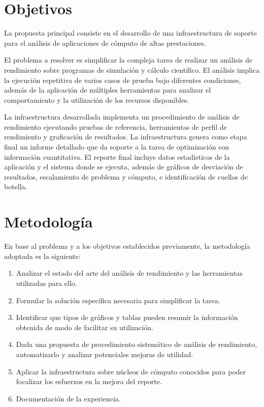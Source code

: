 \documentclass[a4paper]{report}
\begin{document}
\section{Objetivos}

La propuesta principal consiste en el desarrollo de una infraestructura de soporte para el análisis de aplicaciones de cómputo de altas prestaciones.

\bigskip

El problema a resolver es simplificar la compleja tarea de realizar un análisis de rendimiento sobre programas de simulación y cálculo científico. El análisis implica la ejecución repetitiva
de varios casos de prueba bajo diferentes condiciones, además de la aplicación de múltiples herramientas para analizar el comportamiento y la utilización de los recursos disponibles.

\bigskip

La infraestructura desarrollada implementa un procedimiento de análisis de rendimiento ejecutando pruebas de referencia, herramientas de perfil de rendimiento y graficación de resultados.
La infraestructura genera como etapa final un informe detallado que da soporte a la tarea de optimización con información cuantitativa.
El reporte final incluye datos estadísticos de la aplicación y el sistema donde se ejecuta, además de gráficos de desviación de resultados, escalamiento de problema y cómputo, e identificación
de cuellos de botella.

\section{Metodología}

En base al problema y a los objetivos establecidos previamente, la metodología adoptada es la siguiente:

\begin{enumerate}
\item Analizar el estado del arte del análisis de rendimiento y las herramientas utilizadas para ello.
\item Formular la solución específica necesaria para simplificar la tarea.
\item Identificar que tipos de gráficos y tablas pueden resumir la información obtenida de modo de facilitar su utilización.
\item Dada una propuesta de procedimiento sistemático de análisis de rendimiento, automatizarlo y analizar potenciales mejoras de utilidad.
\item Aplicar la infraestructura sobre núcleos de cómputo conocidos para poder focalizar los esfuerzos en la mejora del reporte.
\item Documentación de la experiencia.
\end{enumerate}
\end{document}
